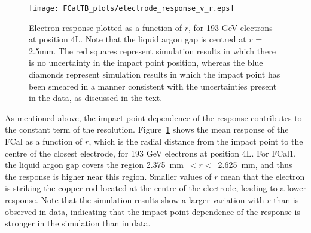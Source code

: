 \begin{figure}[tb]
\begin{centering}

\texttt{[image: FCalTB\_plots/electrode\_response\_v\_r.eps]}
\label{TBplot_noisevbeam_4L}



\caption[Electron response vs distance to closest electrode]{Electron response plotted as a function of $r$, for 193 GeV electrons at position 4L. Note that the liquid argon gap is centred at $r$ = 2.5mm. The red squares represent simulation results in which there is no uncertainty in the impact point position, whereas the blue diamonds represent simulation results in which the impact point has been smeared in a manner consistent with the uncertainties present in the data, as discussed in the text. } 
\label{electrode_r}
\end{centering}
\end{figure}


As mentioned above, the impact point dependence of the response contributes to the constant term of the resolution. Figure~\ref{electrode_r} shows the mean response of the FCal as a function of $r$, which is the radial distance from the impact point to the centre of the closest electrode, for 193 GeV electrons at position 4L. For FCal1, the liquid argon gap covers the region 2.375~mm~$< r <$~2.625~mm, and thus the response is higher near this region. Smaller values of $r$ mean that the electron is striking the copper rod located at the centre of the electrode, leading to a lower response. Note that the simulation results show a larger variation with $r$ than is observed in data, indicating that the impact point dependence of the response is stronger in the simulation than in data. 

